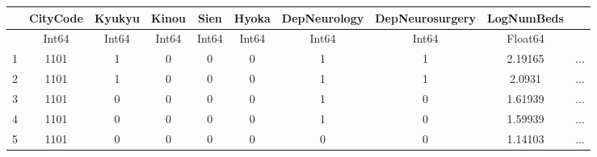 \documentclass[
  letterpaper,
  DIV=11,
  numbers=noendperiod]{scrreprt}
\begin{document}
\begin{tabular}{r|ccccccccc}
    & CityCode & Kyukyu & Kinou & Sien & Hyoka & DepNeurology & DepNeurosurgery & LogNumBeds & \\
    \hline
    & Int64 & Int64 & Int64 & Int64 & Int64 & Int64 & Int64 & Float64 & \\
    \hline
    1 & 1101 & 1 & 0 & 0 & 0 & 1 & 1 & 2.19165 & $\dots$ \\
    2 & 1101 & 1 & 0 & 0 & 0 & 1 & 1 & 2.0931 & $\dots$ \\
    3 & 1101 & 0 & 0 & 0 & 0 & 1 & 0 & 1.61939 & $\dots$ \\
    4 & 1101 & 0 & 0 & 0 & 0 & 1 & 0 & 1.59939 & $\dots$ \\
    5 & 1101 & 0 & 0 & 0 & 0 & 0 & 0 & 1.14103 & $\dots$ \\
\end{tabular}
\end{document}
